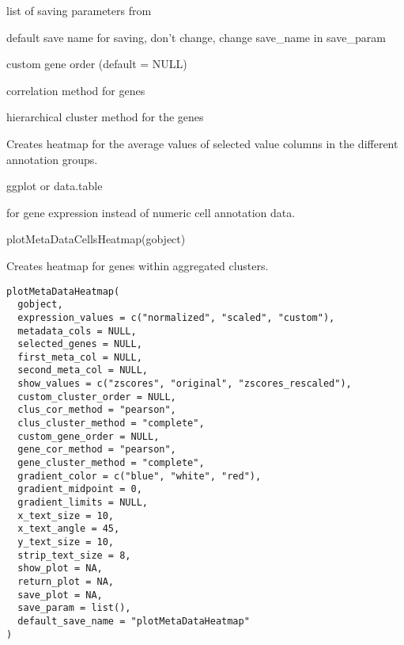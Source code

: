 \documentclass[a4paper]{book}
\begin{document}
\begin{Arguments}
\begin{ldescription}
\item[\code{save\_param}] list of saving parameters from 

\item[\code{default\_save\_name}] default save name for saving, don't change, change save\_name in save\_param

\item[\code{custom\_gene\_order}] custom gene order (default = NULL)

\item[\code{gene\_cor\_method}] correlation method for genes

\item[\code{gene\_cluster\_method}] hierarchical cluster method for the genes
\end{ldescription}
\end{Arguments}
%
\begin{Details}\relax
Creates heatmap for the average values of selected value columns in the different annotation groups.
\end{Details}
%
\begin{Value}
ggplot or data.table
\end{Value}
%
\begin{SeeAlso}\relax
{} for gene expression instead of numeric cell annotation data.
\end{SeeAlso}
%
\begin{Examples}
\begin{ExampleCode}
    plotMetaDataCellsHeatmap(gobject)
\end{ExampleCode}
\end{Examples}
%
\begin{Description}\relax
Creates heatmap for genes within aggregated clusters.
\end{Description}
%
\begin{Usage}
\begin{verbatim}
plotMetaDataHeatmap(
  gobject,
  expression_values = c("normalized", "scaled", "custom"),
  metadata_cols = NULL,
  selected_genes = NULL,
  first_meta_col = NULL,
  second_meta_col = NULL,
  show_values = c("zscores", "original", "zscores_rescaled"),
  custom_cluster_order = NULL,
  clus_cor_method = "pearson",
  clus_cluster_method = "complete",
  custom_gene_order = NULL,
  gene_cor_method = "pearson",
  gene_cluster_method = "complete",
  gradient_color = c("blue", "white", "red"),
  gradient_midpoint = 0,
  gradient_limits = NULL,
  x_text_size = 10,
  x_text_angle = 45,
  y_text_size = 10,
  strip_text_size = 8,
  show_plot = NA,
  return_plot = NA,
  save_plot = NA,
  save_param = list(),
  default_save_name = "plotMetaDataHeatmap"
)
\end{verbatim}
\end{Usage}
\end{document}
